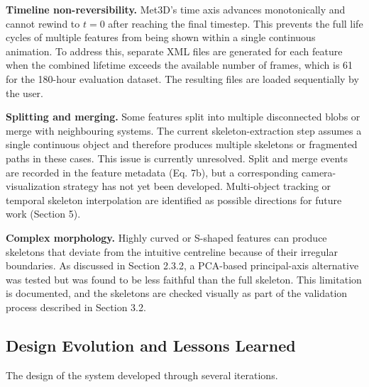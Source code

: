 \documentclass[journal abbreviation, manuscript]{copernicus}
\begin{document}
\textbf{Timeline non-reversibility.}
Met3D's time axis advances monotonically and cannot rewind to $t=0$ after reaching the final timestep. This prevents the full life cycles of multiple features from being shown within a single continuous animation. To address this, separate XML files are generated for each feature when the combined lifetime exceeds the available number of frames, which is 61 for the 180-hour evaluation dataset. The resulting files are loaded sequentially by the user.

\textbf{Splitting and merging.}
Some features split into multiple disconnected blobs or merge with neighbouring systems. The current skeleton-extraction step assumes a single continuous object and therefore produces multiple skeletons or fragmented paths in these cases. This issue is currently unresolved. Split and merge events are recorded in the feature metadata (Eq. 7b), but a corresponding camera-visualization strategy has not yet been developed. Multi-object tracking or temporal skeleton interpolation are identified as possible directions for future work (Section 5).

\textbf{Complex morphology.}
Highly curved or S-shaped features can produce skeletons that deviate from the intuitive centreline because of their irregular boundaries. As discussed in Section 2.3.2, a PCA-based principal-axis alternative was tested but was found to be less faithful than the full skeleton. This limitation is documented, and the skeletons are checked visually as part of the validation process described in Section 3.2.

\subsection{Design Evolution and Lessons Learned}

The design of the system developed through several iterations.
\end{document}
